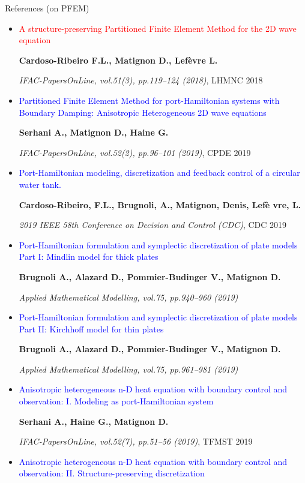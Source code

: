 \documentclass[10pt,aspectratio=43]{ISAE-Beamer}
\newcommand{\blue}[1]{\textcolor{blue}{#1}}
\newcommand{\red}[1]{\textcolor{red}{#1}}
\newcommand{\biblio}{\blue{\tiny\faBook}}
\begin{document}
\begin{frame}{References (on PFEM)}

{\tiny\vspace*{-0.15cm}
\begin{itemize}
\item[\biblio] \red{A structure-preserving Partitioned Finite Element Method for the 2D wave equation}

\textbf{Cardoso-Ribeiro F.L., Matignon D., Lef\`evre L.}

\textit{IFAC-PapersOnLine, vol.51(3), pp.119--124 (2018)}, LHMNC 2018
\vfill
\item[\biblio] \blue{Partitioned Finite Element Method for port-Hamiltonian systems with Boundary Damping: Anisotropic Heterogeneous 2D wave equations}

\textbf{Serhani A., Matignon D., Haine G.}

\textit{IFAC-PapersOnLine, vol.52(2), pp.96--101 (2019)}, CPDE 2019
\vfill
\item[\biblio] \blue{Port-Hamiltonian modeling, discretization and feedback control of a circular water tank.}

\textbf{Cardoso-Ribeiro, F.L., Brugnoli, A., Matignon, Denis, Lef{\`e} vre, L.}

\textit{2019 IEEE 58th Conference on Decision and Control (CDC)}, CDC 2019
\vfill
\item[\biblio] \blue{Port-Hamiltonian formulation and symplectic discretization of plate models Part I: Mindlin model for thick plates}

\textbf{Brugnoli A., Alazard D., Pommier-Budinger V., Matignon D.}

\textit{Applied Mathematical Modelling, vol.75, pp.940--960 (2019)}
\vfill
\item[\biblio] \blue{Port-Hamiltonian formulation and symplectic discretization of plate models Part II: Kirchhoff model for thin plates}

\textbf{Brugnoli A., Alazard D., Pommier-Budinger V., Matignon D.}

\textit{Applied Mathematical Modelling, vol.75, pp.961--981 (2019)}
\vfill
\item[\biblio] \blue{Anisotropic heterogeneous n-D heat equation with boundary control and observation: I. Modeling as port-Hamiltonian system}

\textbf{Serhani A., Haine G., Matignon D.}

\textit{IFAC-PapersOnLine, vol.52(7), pp.51--56 (2019)}, TFMST 2019
\vfill
\item[\biblio] \blue{Anisotropic heterogeneous n-D heat equation with boundary control and observation: II. Structure-preserving discretization}


\end{itemize}}
\end{frame}
\end{document}
